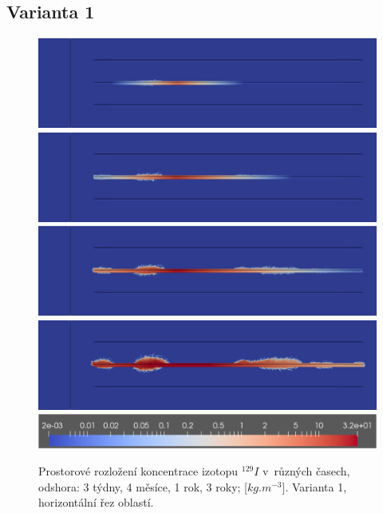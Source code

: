 \documentclass[11pt,a4paper]{article}
\begin{document}
\begin{onehalfspacing}
\subsection{Varianta 1}
\begin{figure}[H]
\centering
\includegraphics[width=16cm]{graphics/obr_ralek/nek_zdroj/01_3w.png}
\includegraphics[width=16cm]{graphics/obr_ralek/nek_zdroj/02_4m.png}
\includegraphics[width=16cm]{graphics/obr_ralek/nek_zdroj/03_1a.png}
\includegraphics[width=16cm]{graphics/obr_ralek/nek_zdroj/04_3a.png}
\includegraphics[width=16cm]{graphics/obr_ralek/nek_zdroj/skala_nek_zdroj.png}
\caption{Prostorové rozložení koncentrace izotopu $^{129}I$ v~různých časech, odshora: 3 týdny, 4 měsíce, 1 rok, 3 roky; [$kg.m^{-3}$]. Varianta 1, horizontální řez oblastí.}
\label{nek_zdroj_01}
\end{figure}


\end{onehalfspacing}
\end{document}
